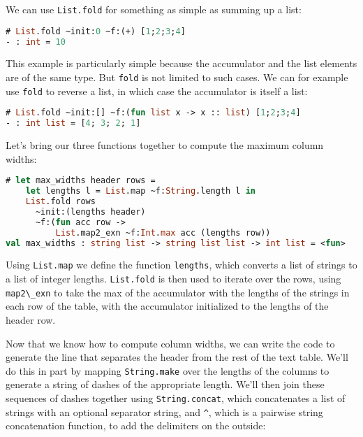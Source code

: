 We can use \passthrough{\lstinline!List.fold!} for something as simple
as summing up a list:

\begin{lstlisting}[language=Caml]
# List.fold ~init:0 ~f:(+) [1;2;3;4]
- : int = 10
\end{lstlisting}

This example is particularly simple because the accumulator and the list
elements are of the same type. But \passthrough{\lstinline!fold!} is not
limited to such cases. We can for example use
\passthrough{\lstinline!fold!} to reverse a list, in which case the
accumulator is itself a list:

\begin{lstlisting}[language=Caml]
# List.fold ~init:[] ~f:(fun list x -> x :: list) [1;2;3;4]
- : int list = [4; 3; 2; 1]
\end{lstlisting}

Let's bring our three functions together to compute the maximum column
widths:

\begin{lstlisting}[language=Caml]
# let max_widths header rows =
    let lengths l = List.map ~f:String.length l in
    List.fold rows
      ~init:(lengths header)
      ~f:(fun acc row ->
          List.map2_exn ~f:Int.max acc (lengths row))
val max_widths : string list -> string list list -> int list = <fun>
\end{lstlisting}

Using \passthrough{\lstinline!List.map!} we define the function
\passthrough{\lstinline!lengths!}, which converts a list of strings to a
list of integer lengths. \passthrough{\lstinline!List.fold!} is then
used to iterate over the rows, using \passthrough{\lstinline!map2\_exn!}
to take the max of the accumulator with the lengths of the strings in
each row of the table, with the accumulator initialized to the lengths
of the header row.

Now that we know how to compute column widths, we can write the code to
generate the line that separates the header from the rest of the text
table. We'll do this in part by mapping
\passthrough{\lstinline!String.make!} over the lengths of the columns to
generate a string of dashes of the appropriate length. We'll then join
these sequences of dashes together using
\passthrough{\lstinline!String.concat!}, which concatenates a list of
strings with an optional separator string, and
\passthrough{\lstinline!^!}, which is a pairwise string concatenation
function, to add the delimiters on the outside:

